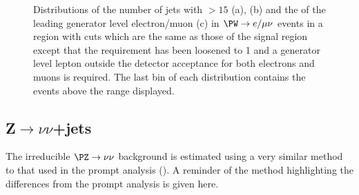 \begin{figure}
  \caption{Distributions of the number of jets with \pt$>15$ \GeV (a), \jetmetdphi (b) and the \pt of the leading generator level electron/muon (c) in $\PW\rightarrow e/\mu\nu$ events in a region with cuts which are the same as those of the signal region except that the \jetmetdphi requirement has been loosened to 1 and a generator level lepton outside the detector acceptance for both electrons and muons is required. The last bin of each distribution contains the events above the range displayed.}
  \label{fig:enumunudiff}
\end{figure}

\subsection{Z$\rightarrow \nu\nu$+jets}
\label{sec:parkedznunu}
The irreducible $\PZ\rightarrow\nu\nu$ background is estimated using a very similar method to that used in the prompt analysis (). A reminder of the method highlighting the differences from the prompt analysis is given here.

